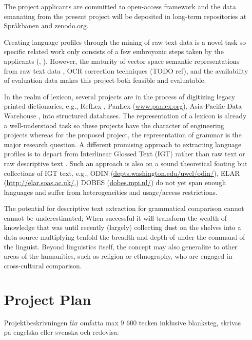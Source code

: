 ﻿\documentclass[12pt]{article}
\begin{document}
The project applicants are committed to open-access framework and the
data emanating from the present project will be deposited in long-term
repositories at Spr\aa{}kbanen and \url{zenodo.org}.

Creating language profiles through the mining of raw text data is a
novel task so specific related work only consists of a few embroyonic
steps taken by the applicants
(\citealt{typ:Hammarstrom:Three-Approaches},
\citealt{cl:Virk:TextCat}). However, the maturity of vector space
semantic representations from raw text data
\citep{cl:Mikolov:Words-Phrases}, OCR correction techniques (TODO
ref), and the availability of evaluation data makes this project both
feasible and evaluatable.

In the realm of lexicon, several projects are in the process of
digitizing legacy printed dictionaries, e.g., RefLex
\citep{v:Segerer:RefLex}, PanLex (\url{www.panlex.org}), Asia-Pacific
Data Warehouse \citep{ling:Cooper:Warehouse}, into structured
databases. The representation of a lexicon is already a
well-understood task so these projects have the character of
engineering projects whereas for the proposed project, the
representation of grammar is the major research question.  A different
promising approach to extracting language profiles is to depart from
Interlinear Glossed Text (IGT) rather than raw text or raw descriptive
text \citep{lkl:Bender:From-IGT}. Such an approach is also on a sound
theoretical footing but collections of IGT text, e.g., ODIN
(\url{depts.washington.edu/uwcl/odin/}), ELAR
(\url{http://elar.soas.ac.uk/},) DOBES (\url{dobes.mpi.nl/}) do not
yet span enough languages and suffer from heterogeneities and
usage/access restrictions.

The potential for descriptive text extraction for grammatical
comparison cannot cannot be underestimated; When successful it will
transform the wealth of knowledge that was until recently (largely)
collecting dust on the shelves into a data source multiplying tenfold
the breadth and depth of under the command of the linguist.
Beyond linguistics itself, the concept may also generalize to other
areas of the humanities, such as religion or ethnography, who are
engaged in cross-cultural comparison.


\section{Project Plan}

Projektbeskrivningen får omfatta max 9 600 tecken inklusive blanksteg, skrivas på engelska eller svenska och redovisa:
\end{document}
